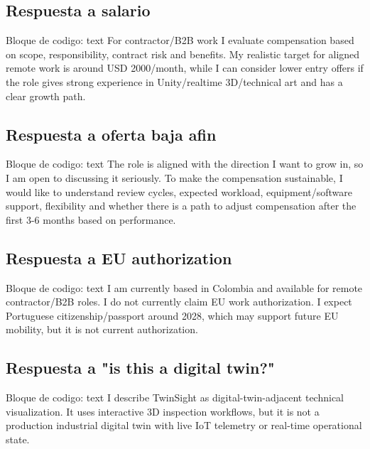 \subsection{Respuesta a salario}


\begin{mdcode}
Bloque de codigo: text
For contractor/B2B work I evaluate compensation based on scope, responsibility, contract risk and benefits. My realistic target for aligned remote work is around USD 2000/month, while I can consider lower entry offers if the role gives strong experience in Unity/realtime 3D/technical art and has a clear growth path.
\end{mdcode}


\subsection{Respuesta a oferta baja afin}


\begin{mdcode}
Bloque de codigo: text
The role is aligned with the direction I want to grow in, so I am open to discussing it seriously. To make the compensation sustainable, I would like to understand review cycles, expected workload, equipment/software support, flexibility and whether there is a path to adjust compensation after the first 3-6 months based on performance.
\end{mdcode}


\subsection{Respuesta a EU authorization}


\begin{mdcode}
Bloque de codigo: text
I am currently based in Colombia and available for remote contractor/B2B roles. I do not currently claim EU work authorization. I expect Portuguese citizenship/passport around 2028, which may support future EU mobility, but it is not current authorization.
\end{mdcode}


\subsection{Respuesta a "is this a digital twin?"}


\begin{mdcode}
Bloque de codigo: text
I describe TwinSight as digital-twin-adjacent technical visualization. It uses interactive 3D inspection workflows, but it is not a production industrial digital twin with live IoT telemetry or real-time operational state.
\end{mdcode}


